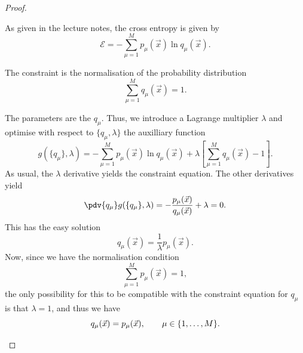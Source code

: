 \begin{proof}
	\begin{parts}
	\item As given in the lecture notes, the cross entropy is given by
		\[
			\mathcal{E} = -\sum_{\mu=1}^{M} p_\mu(\vec{x}) \ln q_\mu(\vec{x}) 
		.\] 
	\item The constraint is the normalisation of the probability distribution
		\[
			\sum_{\mu=1}^M q_\mu(\vec{x}) = 1
		.\] 
	\item The parameters are the $q_\mu$. Thus, we introduce a Lagrange multiplier $\lambda$ and optimise with respect to $\{q_\mu, \lambda\} $ the auxilliary function
		\[
			g(\{q_\mu\}, \lambda) = -\sum_{\mu=1}^{M} p_\mu(\vec{x}) \ln q_\mu(\vec{x}) + \lambda \left[\sum_{\mu=1}^{M} q_\mu(\vec{x})-1\right]
		.\] 
		As usual, the $\lambda$ derivative yields the constraint equation. The other derivatives yield
		\[
			\pdv{q_\mu}g(\{q_\mu\} ,\lambda) = - \frac{p_\mu(\vec{x})}{q_\mu(\vec{x})}+\lambda = 0
		.\] 
		This has the easy solution
		\[
			q_\mu(\vec{x}) = \frac{1}{\lambda}p_\mu(\vec{x})
		.\] 
		Now, since we have the normalisation condition
		\[
			\sum_{\mu=1}^{M} p_\mu(\vec{x}) = 1
		,\] 
		the only possibility for this to be compatible with the constraint equation for $q_\mu$ is that $\lambda=1$, and thus we have
		\[
			q_\mu(\vec{x})=p_\mu(\vec{x}),\qquad \mu\in \{1, \dots, M\}  
		.\qedhere\] 
	\end{parts}
\end{proof}
